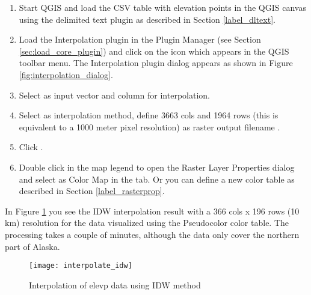 \begin{enumerate}
  \item Start QGIS and load the  CSV table with elevation points in the QGIS 
  canvas using the delimited text plugin as described in Section \ref{label_dltext}. 
  \item Load the Interpolation plugin in the Plugin Manager (see Section 
  \ref{sec:load_core_plugin}) and click on the  
  icon which appears in the QGIS toolbar menu. The Interpolation plugin dialog appears as shown in Figure \ref{fig:interpolation_dialog}.
  \item Select  as input vector and column  for 
  interpolation.
  \item Select  as interpolation method, define 
  3663 cols and 1964 rows (this is equivalent to a 1000 meter pixel resolution) as raster 
  output filename .
  \item Click .
  \item Double click  in the map legend to open the Raster Layer Properties 
  dialog and select  as Color Map in the  tab. Or you 
  can define a new color table as described in Section \ref{label_rasterprop}.
\end{enumerate}

In Figure \ref{fig:interpolation_idw} you see the IDW interpolation result with a 366 cols x 196 rows (10 km) 
resolution for the  data visualized using the Pseudocolor color table. The processing 
takes a couple of minutes, although the data only cover the northern part of Alaska.

\begin{figure}[ht]
   \begin{center}
   \caption{Interpolation of elevp data using IDW method \nixcaption}\label{fig:interpolation_idw}\smallskip
   \texttt{[image: interpolate\_idw]}
\end{center}  
\end{figure}

\newpage



